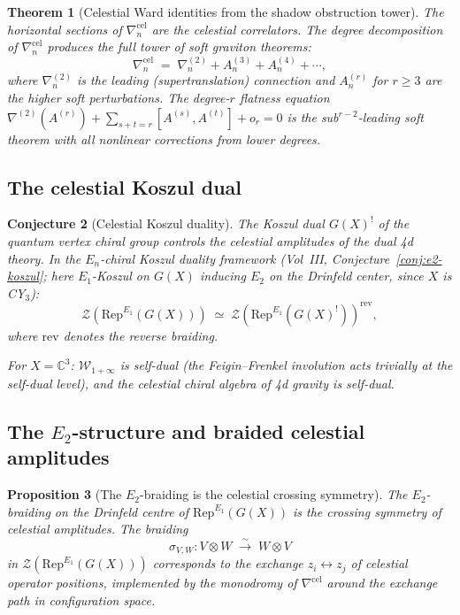 \documentclass[11pt]{article}
\newtheorem{theorem}{Theorem}[section]
\newtheorem{proposition}[theorem]{Proposition}
\newtheorem{conjecture}[theorem]{Conjecture}
\theoremstyle{definition}
\theoremstyle{remark}
\newcommand{\cW}{\mathcal{W}}
\newcommand{\cZ}{\mathcal{Z}}
\newcommand{\Rep}{\mathrm{Rep}}
\begin{document}
\begin{theorem}[Celestial Ward identities from the shadow obstruction tower]
\label{thm:celestial-ward}
The horizontal sections of $\nabla^{\mathrm{cel}}_n$ are the
celestial correlators. The degree decomposition of
$\nabla^{\mathrm{cel}}_n$ produces the full tower of soft
graviton theorems:
\begin{equation}\label{eq:celestial-ward-tower}
\nabla^{\mathrm{cel}}_n
\;=\;
\nabla^{(2)}_n + A^{(3)}_n + A^{(4)}_n + \cdots,
\end{equation}
where $\nabla^{(2)}_n$ is the leading (supertranslation)
connection and $A^{(r)}_n$ for $r \geq 3$ are the higher soft
perturbations. The degree-$r$ flatness equation
$\nabla^{(2)}(A^{(r)}) + \sum_{s+t=r}[A^{(s)}, A^{(t)}] +
o_r = 0$ is the sub$^{r-2}$-leading soft theorem with all
nonlinear corrections from lower degrees.
\end{theorem}

\subsection{The celestial Koszul dual}

\begin{conjecture}[Celestial Koszul duality]
\label{conj:celestial-koszul}
The Koszul dual $G(X)^!$ of the quantum vertex chiral group
controls the celestial amplitudes of the \emph{dual} 4d theory.
In the $E_n$-chiral Koszul duality framework (Vol~III,
Conjecture~\ref*{conj:e2-koszul}; here $E_1$-Koszul on $G(X)$
inducing $E_2$ on the Drinfeld center, since $X$ is CY$_3$):
\begin{equation}\label{eq:celestial-koszul}
\cZ(\Rep^{E_1}(G(X)))
\;\simeq\;
\cZ(\Rep^{E_1}(G(X)^!))^{\mathrm{rev}},
\end{equation}
where $\mathrm{rev}$ denotes the reverse braiding.

For $X = \mathbb{C}^3$: $\cW_{1+\infty}$ is self-dual (the
Feigin--Frenkel involution acts trivially at the self-dual level),
and the celestial chiral algebra of 4d gravity is self-dual.
\end{conjecture}

\subsection{The $E_2$-structure and braided celestial amplitudes}

\begin{proposition}[The $E_2$-braiding is the celestial crossing symmetry]
\label{prop:e2-crossing}
The $E_2$-braiding on the Drinfeld centre of $\Rep^{E_1}(G(X))$
is the crossing symmetry of celestial
amplitudes. The braiding
\[
\sigma_{V,W} \colon V \otimes W \;\xrightarrow{\sim}\; W \otimes V
\]
in $\cZ(\Rep^{E_1}(G(X)))$ corresponds to the exchange
$z_i \leftrightarrow z_j$ of celestial operator positions,
implemented by the monodromy of $\nabla^{\mathrm{cel}}$ around the
exchange path in configuration space.
\end{proposition}
\end{document}
